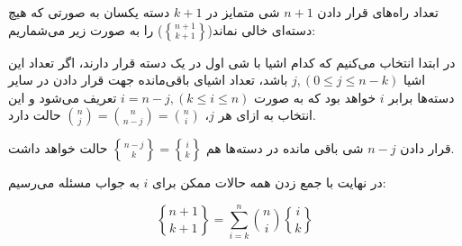     \p
    تعداد راه‌های قرار دادن
    $n+1$
    شی متمایز در
    $k+1$
    دسته یکسان به صورتی که هیچ دسته‌ای خالی نماند($\genfrac{\{}{\}}{0pt}{}{n + 1}{k + 1}$) را به صورت زیر می‌شماریم:
    
    \p
    در ابتدا انتخاب می‌کنیم که کدام اشیا با شی اول در یک دسته قرار دارند، اگر تعداد این اشیا $j, (0 \leq j \leq n - k)$ باشد،
    تعداد اشیای باقی‌مانده جهت قرار دادن در سایر دسته‌ها برابر
    $i$
    خواهد بود که به صورت
    $i= n-j ,(k \leq i \leq n)$
    تعریف می‌شود و این انتخاب
    به ازای هر $j$، ${n\choose j}={n \choose n-j}={n\choose i}$ حالت دارد.
    
    \p
	قرار دادن $n-j$ شی باقی مانده در دسته‌ها هم $\genfrac{\{}{\}}{0pt}{}{n-j}{k}=\genfrac{\{}{\}}{0pt}{}{i}{k}$ حالت خواهد داشت.

    
    \p
	در نهایت با جمع زدن همه حالات ممکن برای $i$ به جواب مسئله می‌رسیم:
    
    $$\genfrac{\{}{\}}{0pt}{}{n + 1}{k + 1} = \sum\limits_{i=k}^{n} {n\choose i} \genfrac{\{}{\}}{0pt}{}{i}{k}$$
